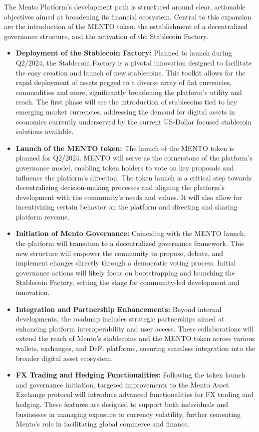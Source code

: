\documentclass[a4paper]{article}
\theoremstyle{definition}
\begin{document}
The Mento Platform's development path is structured around clear, actionable objectives aimed at broadening its financial ecosystem. Central to this expansion are the introduction of the MENTO token, the establishment of a decentralized governance structure, and the activation of the Stablecoin Factory.

\begin{itemize}
    \item \textbf{Deployment of the Stablecoin Factory:}
    Planned to launch during Q2/2024, the Stablecoin Factory is a pivotal innovation designed to facilitate the easy creation and launch of new stablecoins. This toolkit allows for the rapid deployment of assets pegged to a diverse array of fiat currencies, commodities and more, significantly broadening the platform's utility and reach. The first phase will see the introduction of stablecoins tied to key emerging market currencies, addressing the demand for digital assets in economies currently underserved by the current US-Dollar focused stablecoin solutions available.

    \item \textbf{Launch of the MENTO token:}
    The launch of the MENTO token is planned for Q2/2024. MENTO will serve as the cornerstone of the platform's governance model, enabling token holders to vote on key proposals and influence the platform's direction. The token launch is a critical step towards decentralizing decision-making processes and aligning the platform's development with the community's needs and values. It will also allow for incentivizing certain behavior on the platform and directing and sharing platform revenue.

    \item \textbf{Initiation of Mento Governance:}
    Coinciding with the MENTO launch, the platform will transition to a decentralized governance framework. This new structure will empower the community to propose, debate, and implement changes directly through a democratic voting process. Initial governance actions will likely focus on bootstrapping and launching the Stablecoin Factory, setting the stage for community-led development and innovation.

    \item \textbf{Integration and Partnership Enhancements:}
    Beyond internal developments, the roadmap includes strategic partnerships aimed at enhancing platform interoperability and user access. These collaborations will extend the reach of Mento's stablecoins and the MENTO token across various wallets, exchanges, and DeFi platforms, ensuring seamless integration into the broader digital asset ecosystem.
    
    \item \textbf{FX Trading and Hedging Functionalities:}
    Following the token launch and governance initiation, targeted improvements to the Mento Asset Exchange protocol will introduce advanced functionalities for FX trading and hedging. These features are designed to support both individuals and businesses in managing exposure to currency volatility, further cementing Mento's role in facilitating global commerce and finance.

\end{itemize}
\end{document}

